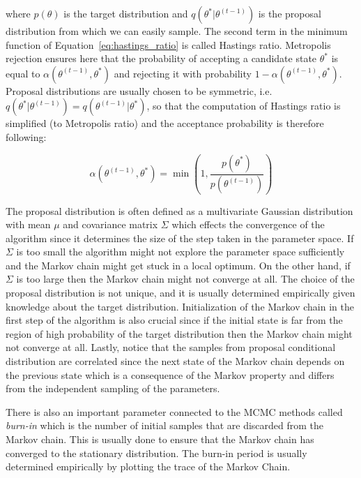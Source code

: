 where $p(\theta)$ is the target distribution and $q(\theta^*|\theta^{(t-1)})$ is the proposal distribution from which we can easily sample.
The second term in the minimum function of Equation~\ref{eq:hastings_ratio} is called Hastings ratio. Metropolis rejection ensures here that 
the probability of accepting a candidate state $\theta^*$ is equal to $\alpha(\theta^{(t-1)},\theta^*)$ and rejecting it with probability $1 - \alpha(\theta^{(t-1)},\theta^*)$.
Proposal distributions are usually chosen to be symmetric, i.e. $q(\theta^*|\theta^{(t-1)}) = q(\theta^{(t-1)}|\theta^*)$, 
so that the computation of Hastings ratio is simplified (to Metropolis ratio) and the acceptance probability is therefore following:

\begin{equation}
    \alpha(\theta^{(t-1)},\theta^*) = \min \left(1,\frac{p(\theta^*)}{p(\theta^{(t-1)})}\right)
\end{equation}

The proposal distribution is often defined as a multivariate Gaussian distribution with mean $\mu$ and covariance matrix $\Sigma$ which effects the convergence of the algorithm since it determines the size of the step taken in the parameter space. 
If $\Sigma$ is too small the algorithm might not explore the parameter space sufficiently and the Markov chain might get stuck in a local optimum. On the other hand, if $\Sigma$ is too large then the Markov chain might not converge at all. 
The choice of the proposal distribution is not unique, and it is usually determined empirically given knowledge about the target distribution. 
Initialization of the Markov chain in the first step of the algorithm is also crucial since if the initial state is far from the region of high probability of the target distribution then the Markov chain might not converge at all.
Lastly, notice that the samples from proposal conditional distribution are correlated since the next state of the Markov chain depends on the previous state which is a consequence of the Markov property and differs from the independent sampling of the parameters.~\citep{Mikusheva2007}

There is also an important parameter connected to the MCMC methods called \textit{burn-in} which is the number of initial samples that are discarded from the Markov chain. This is usually 
done to ensure that the Markov chain has converged to the stationary distribution. The burn-in period is usually determined empirically by plotting the trace of the Markov Chain.~\citep{Navarro2011}

